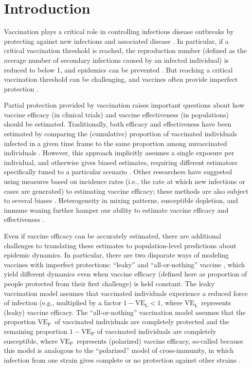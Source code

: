 \documentclass[12pt]{article}
\newcommand{\VE}{\ensuremath{\mathrm{VE}}}
\newcommand{\VEP}{\ensuremath{\VE_{\mathrm{P}}}}
\newcommand{\VEL}{\ensuremath{\VE_{\mathrm{L}}}}
\begin{document}
\pagebreak

\section*{Introduction}

Vaccination plays a critical role in controlling infectious disease outbreaks by protecting against new infections and associated disease \citep{iwasaki2020and}.
In particular, if a critical vaccination threshold is reached, the reproduction number (defined as the average number of secondary infections caused by an infected individual) is reduced to below 1, and epidemics can be prevented \citep{anderson1985vaccination}.
But reaching a critical vaccination threshold can be challenging, and vaccines often provide imperfect protection \citep{gandon2003imperfect,anderson2020challenges}.

Partial protection provided by vaccination raises important questions about how vaccine efficacy (in clinical trials) and vaccine effectiveness (in populations) should be estimated.
Traditionally, both efficacy and effectiveness have been estimated by comparing the (cumulative) proportion of vaccinated individuals infected in a given time frame to the same proportion among unvaccinated individuals \citep{farrington1993estimation}.
However, this approach implicitly assumes a single exposure per individual, and otherwise gives biased estimates, requiring different estimators specifically tuned to a particular scenario \citep{halloran1991direct}.
Other researchers have suggested using measures based on incidence rates (i.e., the rate at which new infections or cases are generated) to estimating vaccine efficacy; these methods are also subject to several biases \citep{rinta2009estimation,lipsitch2021interpreting}.
Heterogeneity in mixing patterns, susceptible depletion, and immune waning further hamper our ability to estimate vaccine efficacy and effectiveness \citep{halloran1992interpretation,lipsitch2019challenges,kahn2022identifying}.

Even if vaccine efficacy can be accurately estimated, there are additional challenges to translating these estimates to population-level predictions about epidemic dynamics.
In particular, there are two disparate ways of modeling vaccines with imperfect protections: ``leaky'' and ``all-or-nothing'' vaccine \citep{smith1984assessment}, which yield different dynamics even when vaccine efficacy (defined here as proportion of people protected from their first challenge) is held constant.
The leaky vaccination model assumes that vaccinated individuals experience a reduced force of infection (e.g., multiplied by a factor $1-\VEL < 1$, where \VEL\ represents (leaky) vaccine efficacy.
The ``all-or-nothing'' vaccination model assumes that the proportion \VEP\ of vaccinated individuals are completely protected and the remaining proportion $1-\VEP$ of vaccinated individuals are completely susceptible, where \VEP\ represents (polarized) vaccine efficacy, 
so-called because this model is analogous to the “polarized” model of cross-immunity, in which infection from one strain gives complete or no protection against other strains \citep{gog2002dynamics,gomes2014missing}.
\end{document}
